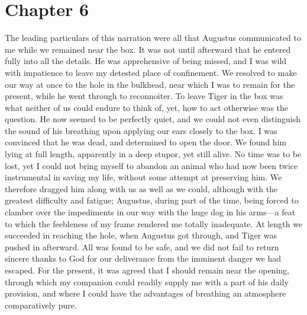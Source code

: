 \section{Chapter 6}
The leading particulars of this narration were all that Augustus
communicated to me while we remained near the box. It was not until afterward
that he entered fully into all the details. He was apprehensive of being missed,
and I was wild with impatience to leave my detested place of confinement. We
resolved to make our way at once to the hole in the bulkhead, near which I was
to remain for the present, while he went through to reconnoiter. To leave Tiger
in the box was what neither of us could endure to think of, yet, how to act
otherwise was the question. He now seemed to be perfectly quiet, and we could
not even distinguish the sound of his breathing upon applying our ears closely
to the box. I was convinced that he was dead, and determined to open the door.
We found him lying at full length, apparently in a deep stupor, yet still alive.
No time was to be lost, yet I could not bring myself to abandon an animal who
had now been twice instrumental in saving my life, without some attempt at
preserving him. We therefore dragged him along with us as well as we could,
although with the greatest difficulty and fatigue; Augustus, during part of the
time, being forced to clamber over the impediments in our way with the huge dog
in his arms---a feat to which the feebleness of my frame rendered me totally
inadequate. At length we succeeded in reaching the hole, when Augustus got
through, and Tiger was pushed in afterward. All was found to be safe, and we did
not fail to return sincere thanks to God for our deliverance from the imminent
danger we had escaped. For the present, it was agreed that I should remain near
the opening, through which my companion could readily supply me with a part of
his daily provision, and where I could have the advantages of breathing an
atmosphere comparatively pure. 

